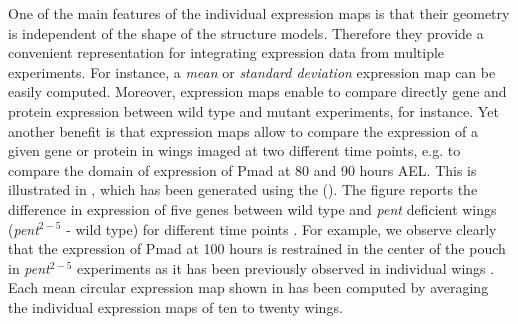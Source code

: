 One of the main features of the individual expression maps is that their geometry is independent of the shape of the structure models. Therefore they provide a convenient representation for integrating expression data from multiple experiments. For instance, a \textit{mean} or \textit{standard deviation} expression map can be easily computed. Moreover, expression maps enable to compare directly gene and protein expression between wild type and mutant experiments, for instance. Yet another benefit is that expression maps allow to compare the expression of a given gene or protein in wings imaged at two different time points, e.g. to compare the domain of expression of Pmad at 80 and 90 hours AEL. This is illustrated in , which has been generated using the \wingjMatlab (). The figure reports the difference in expression of five genes between wild type and \textit{pent} deficient wings (\textit{pent$^{2-5}$} - wild type) for different time points \autocite{schaffter2013}. For example, we observe clearly that the expression of Pmad at 100 hours is restrained in the center of the pouch in \textit{pent$^{2-5}$} experiments as it has been previously observed in individual wings \autocite{hamaratoglu2011dpp}. Each mean circular expression map shown in  has been computed by averaging the individual expression maps of ten to twenty wings.\\

